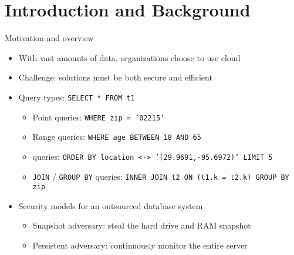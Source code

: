 \section{Introduction and Background}

	\begin{frame}{Motivation and overview}

		\begin{itemize}
			\item<1-> With vast amounts of data, organizations choose to use cloud
			\item<1-> \alert{Challenge:} solutions must be both secure and efficient
			\item<2-> Query types: \texttt{SELECT * FROM t1 }
				\begin{itemize}
					\item<1,2,6-> Point queries: \texttt{WHERE zip = '02215'}
					\item<1,3,6-> Range queries: \texttt{WHERE age BETWEEN 18 AND 65}
					\item<1,4,6-> \knn{} queries: \texttt{ORDER BY location <-> '(29.9691,-95.6972)' LIMIT 5} %
					\item<1,5,6-> \texttt{JOIN} / \texttt{GROUP BY} queries: \texttt{INNER JOIN t2 ON (t1.k = t2.k) GROUP BY zip}
				\end{itemize}
			\item<6-> Security models for an outsourced database system
				\begin{itemize}
					\item<1-5,7> Snapshot adversary: steal the hard drive and RAM snapshot %
					\item<1-5,8> Persistent adversary: continuously monitor the entire server %
				\end{itemize}
		\end{itemize}

	\end{frame}


